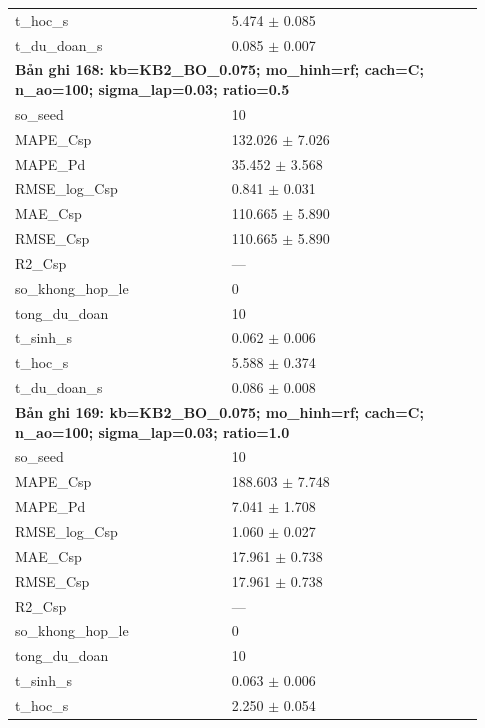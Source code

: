 \begin{longtable}{p{0.43\linewidth}p{0.50\linewidth}}
t\_\allowbreak hoc\_\allowbreak s & 5.474 $\pm$ 0.085 \\
t\_\allowbreak du\_\allowbreak doan\_\allowbreak s & 0.085 $\pm$ 0.007 \\
\midrule
\multicolumn{2}{p{0.95\linewidth}}{\textbf{Bản ghi 168: kb=KB2\_BO\_0.075; mo\_hinh=rf; cach=C; n\_ao=100; sigma\_lap=0.03; ratio=0.5}} \\
so\_\allowbreak seed & 10 \\
MAPE\_\allowbreak Csp & 132.026 $\pm$ 7.026 \\
MAPE\_\allowbreak Pd & 35.452 $\pm$ 3.568 \\
RMSE\_\allowbreak log\_\allowbreak Csp & 0.841 $\pm$ 0.031 \\
MAE\_\allowbreak Csp & 110.665 $\pm$ 5.890 \\
RMSE\_\allowbreak Csp & 110.665 $\pm$ 5.890 \\
R2\_\allowbreak Csp & — \\
so\_\allowbreak khong\_\allowbreak hop\_\allowbreak le & 0 \\
tong\_\allowbreak du\_\allowbreak doan & 10 \\
t\_\allowbreak sinh\_\allowbreak s & 0.062 $\pm$ 0.006 \\
t\_\allowbreak hoc\_\allowbreak s & 5.588 $\pm$ 0.374 \\
t\_\allowbreak du\_\allowbreak doan\_\allowbreak s & 0.086 $\pm$ 0.008 \\
\midrule
\multicolumn{2}{p{0.95\linewidth}}{\textbf{Bản ghi 169: kb=KB2\_BO\_0.075; mo\_hinh=rf; cach=C; n\_ao=100; sigma\_lap=0.03; ratio=1.0}} \\
so\_\allowbreak seed & 10 \\
MAPE\_\allowbreak Csp & 188.603 $\pm$ 7.748 \\
MAPE\_\allowbreak Pd & 7.041 $\pm$ 1.708 \\
RMSE\_\allowbreak log\_\allowbreak Csp & 1.060 $\pm$ 0.027 \\
MAE\_\allowbreak Csp & 17.961 $\pm$ 0.738 \\
RMSE\_\allowbreak Csp & 17.961 $\pm$ 0.738 \\
R2\_\allowbreak Csp & — \\
so\_\allowbreak khong\_\allowbreak hop\_\allowbreak le & 0 \\
tong\_\allowbreak du\_\allowbreak doan & 10 \\
t\_\allowbreak sinh\_\allowbreak s & 0.063 $\pm$ 0.006 \\
t\_\allowbreak hoc\_\allowbreak s & 2.250 $\pm$ 0.054 \\

\end{longtable}
